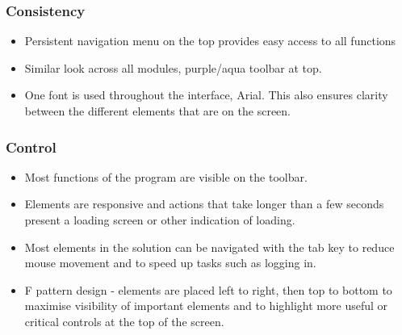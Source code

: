 \documentclass[oneside,openany,11pt,a4paper]{report}
\begin{document}
\subsubsection{Consistency}
\begin{itemize}
	\itemsep0em
	\item Persistent navigation menu on the top provides easy access to all functions
	\item Similar look across all modules, purple/aqua toolbar at top.
	\item One font is used throughout the interface, Arial. This also ensures clarity between the different elements that are on the screen.
\end{itemize}

\subsubsection{Control}

\begin{itemize}
	\itemsep0em
	\item Most functions of the program are visible on the toolbar.
	\item Elements are responsive and actions that take longer than a few seconds present a loading screen or other indication of loading.
	\item Most elements in the solution can be navigated with the tab key to reduce mouse movement and to speed up tasks such as logging in.
	\item F pattern design - elements are placed left to right, then top to bottom to maximise visibility of important elements and to highlight more useful or critical controls at the top of the screen.
\end{itemize}

 \setlength{\belowcaptionskip}{-10pt} 
  \setlength{\floatsep}{-10pt} 
\end{document}

